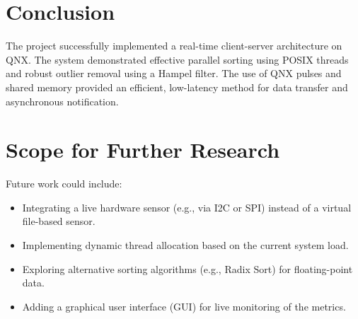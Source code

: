 \documentclass[12pt,a4paper,oneside]{report}
\begin{document}
\section{Conclusion}
The project successfully implemented a real-time client-server architecture on QNX. The system demonstrated effective parallel sorting using POSIX threads and robust outlier removal using a Hampel filter. The use of QNX pulses and shared memory provided an efficient, low-latency method for data transfer and asynchronous notification.

\section{Scope for Further Research}
Future work could include:
\begin{itemize}
    \item Integrating a live hardware sensor (e.g., via I2C or SPI) instead of a virtual file-based sensor.
    \item Implementing dynamic thread allocation based on the current system load.
    \item Exploring alternative sorting algorithms (e.g., Radix Sort) for floating-point data.
    \item Adding a graphical user interface (GUI) for live monitoring of the metrics.
\end{itemize}
\end{document}
